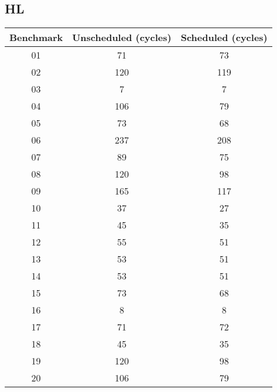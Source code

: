 \documentclass{article}
\begin{document}
\subsection{HL}
\begin{center}
    \begin{tabular} {|c | c | c|}
        \hline
        Benchmark & Unscheduled (cycles)  & Scheduled (cycles) \\ \hline \hline
        01 & 71 & 73 \\ \hline
        02 & 120 & 119 \\ \hline
        03 & 7 & 7 \\ \hline
        04 & 106 & 79 \\ \hline
        05 & 73 & 68 \\ \hline
        06 & 237 & 208 \\ \hline
        07 & 89 & 75 \\ \hline
        08 & 120 & 98 \\ \hline
        09 & 165 & 117 \\ \hline
        10 & 37 & 27 \\ \hline
        11 & 45 & 35 \\ \hline
        12 & 55 & 51 \\ \hline
        13 & 53 & 51 \\ \hline
        14 & 53 & 51 \\ \hline
        15 & 73 & 68 \\ \hline
        16 & 8 & 8 \\ \hline
        17 & 71 & 72 \\ \hline
        18 & 45 & 35 \\ \hline
        19 & 120 & 98 \\ \hline
        20 & 106 & 79 \\ 
        \hline
    \end{tabular}
\end{center}
\end{document}
